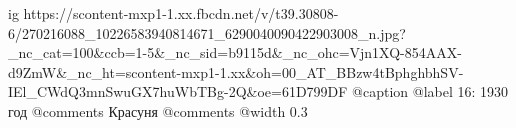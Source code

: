  
 
 
 
 

\ifcmt
  ig https://scontent-mxp1-1.xx.fbcdn.net/v/t39.30808-6/270216088_10226583940814671_6290040090422903008_n.jpg?_nc_cat=100&ccb=1-5&_nc_sid=b9115d&_nc_ohc=Vjn1XQ-854AAX-d9ZmW&_nc_ht=scontent-mxp1-1.xx&oh=00_AT_BBzw4tBphghbhSV-IEl_CWdQ3mnSwuGX7huWbTBg-2Q&oe=61D799DF
	@caption @label 16: 1930 год
	@comments%
    Красуня
	@comments%
  @width 0.3
\fi
